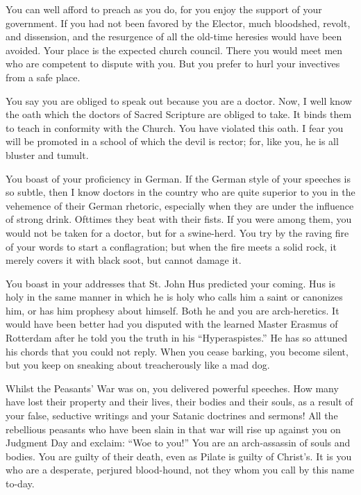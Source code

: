 You can well afford to preach as you do, for you enjoy the support of
your government. If you had not been favored by the Elector, much bloodshed,
revolt, and dissension, and the resurgence of all the old-time heresies
would have been avoided. Your place is the expected church council. There
you would meet men who are competent to dispute with you. But you prefer
to hurl your invectives from a safe place.

You say you are obliged to speak out because you are a doctor. Now,
I well know the oath which the doctors of Sacred Scripture are obliged to
take. It binds them to teach in conformity with the Church. You have
violated this oath. I fear you will be promoted in a school of which the devil
is rector; for, like you, he is all bluster and tumult.

You boast of your proficiency in German. If the German style of your
speeches is so subtle, then I know doctors in the country who are quite superior
to you in the vehemence of their German rhetoric, especially when
they are under the influence of strong drink. Ofttimes they beat with their
fists. If you were among them, you would not be taken for a doctor, but
for a swine-herd. You try by the raving fire of your words to start
a conflagration; but when the fire meets a solid rock, it merely covers it with
black soot, but cannot damage it.

You boast in your addresses that St. John Hus predicted your coming.
Hus is holy in the same manner in which he is holy who calls him a saint
or canonizes him, or has him prophesy about himself. Both he and you are
arch-heretics. It would have been better had you disputed with the learned
Master Erasmus of Rotterdam after he told you the
truth in his “Hyperaspistes.” He has so attuned his chords that you
could not reply. When you cease barking, you become silent, but you keep on sneaking about
treacherously like a mad dog.

Whilst the Peasants’ War was on, you delivered powerful speeches. How
many have lost their property and their lives, their bodies and their souls, as
a result of your false, seductive writings and your Satanic doctrines and
sermons! All the rebellious peasants who have been slain in that war will rise
up against you on Judgment Day and exclaim: “Woe to you!” You are an
arch-assassin of souls and bodies. You are guilty of their death, even as Pilate
is guilty of Christ’s. It is you who are a desperate, perjured blood-hound, not
they whom you call by this name to-day.

